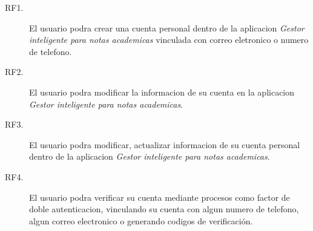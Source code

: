 \begin{description}
    \item[RF1.] El usuario podra crear una cuenta personal dentro de la aplicacion \emph{Gestor inteligente para notas academicas} vinculada con correo eletronico o numero de telefono.

    \item[RF2.] El usuario podra modificar la informacion de su cuenta en la aplicacion \emph{Gestor inteligente para notas academicas}.

    \item[RF3.] El usuario podra modificar, actualizar informacion de su cuenta personal dentro de la aplicacion \emph{Gestor inteligente para notas academicas}.
    
    \item[RF4.]El usuario podra verificar su cuenta mediante procesos como factor de doble autenticacion, vinculando su cuenta con algun numero de telefono, algun correo electronico o generando codigos de verificación.
    

\end{description}
